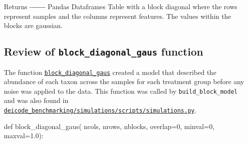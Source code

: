 \documentclass[
]{article}
\newenvironment{Shaded}{}{}
\newcommand{\ControlFlowTok}[1]{\textcolor[rgb]{0.65,0.15,0.64}{#1}}
\newcommand{\DecValTok}[1]{\textcolor[rgb]{0.60,0.41,0.00}{#1}}
\newcommand{\FloatTok}[1]{\textcolor[rgb]{0.60,0.41,0.00}{#1}}
\newcommand{\KeywordTok}[1]{\textcolor[rgb]{0.65,0.15,0.64}{#1}}
\newcommand{\NormalTok}[1]{\textcolor[rgb]{0.22,0.23,0.26}{#1}}
\newcommand{\OperatorTok}[1]{\textcolor[rgb]{0.65,0.15,0.64}{#1}}
\begin{document}
\footnotesize

\begin{Shaded}
\begin{Highlighting}[numbers=left,,firstnumber=223,]
\NormalTok{    Returns}
    \OperatorTok{{-}{-}{-}{-}{-}{-}{-}}
\NormalTok{    Pandas Dataframes}
\NormalTok{    Table }\ControlFlowTok{with}\NormalTok{ a block diagonal where the rows represent samples}
    \KeywordTok{and}\NormalTok{ the columns represent features.  The values within the blocks}
\NormalTok{    are gaussian.}
\end{Highlighting}
\end{Shaded}

\normalsize{}

\subsection{\texorpdfstring{Review of \texttt{block\_diagonal\_gaus}
function}{Review of block\_diagonal\_gaus function}}\label{review-of-block_diagonal_gaus-function}

The function
\href{https://github.com/SchlossLab/Schloss_RPCA_mSystems_2026/blob/main/deicode_benchmarking/simulations/scripts/simulations.py\#73}{\texttt{block\_diagonal\_gaus}}
created a model that described the abundance of each taxon across the
samples for each treatment group before any noise was applied to the
data. This function was called by \texttt{build\_block\_model} and was
also found in
\href{https://github.com/SchlossLab/Schloss_RPCA_mSystems_2026/blob/main/deicode_benchmarking/simulations/scripts/simulations.py}{\texttt{deicode\_benchmarking/simulations/scripts/simulations.py}}.

\footnotesize

\begin{Shaded}
\begin{Highlighting}[numbers=left,,firstnumber=73,]
\KeywordTok{def}\NormalTok{ block\_diagonal\_gaus(}
\NormalTok{        ncols,}
\NormalTok{        nrows,}
\NormalTok{        nblocks,}
\NormalTok{        overlap}\OperatorTok{=}\DecValTok{0}\NormalTok{,}
\NormalTok{        minval}\OperatorTok{=}\DecValTok{0}\NormalTok{,}
\NormalTok{        maxval}\OperatorTok{=}\FloatTok{1.0}\NormalTok{):}
\end{Highlighting}
\end{Shaded}

\normalsize{}
\end{document}
